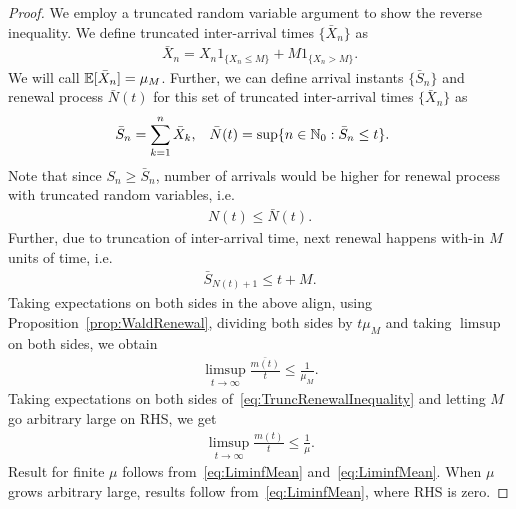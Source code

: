 \documentclass[a4paper,10pt, english]{article}
\begin{document}
\begin{proof}
	We employ a truncated random variable argument to show the reverse inequality. We define truncated inter-arrival times $\{\bar{X}_n\}$ as 
	\begin{align*}
	\bar{X}_n = X_n 1_{\{X_n \leq M\}} + M1_{\{X_n > M\}}.
	\end{align*}
	We will call $\mathbb{E}[\bar{X}_n] = \mu_M$. Further, we can define arrival instants $\{\bar{S}_n\}$ and renewal process $\bar{N}(t)$ for this set of truncated inter-arrival times $\{\bar{X}_n\}$ as 
	\begin{align*}
	\bar{S}_n &= \sum_{k=1}^n \bar{X}_k, & \bar{N}(t) &= \sup\{n \in \mathbb{N}_0: \bar{S}_n \leq t\}.
	\end{align*}
	Note that since $S_n \geq \bar{S}_n$, number of arrivals would be higher for renewal process with truncated random variables, i.e. 
	\begin{align}
	\label{eq:TruncRenewalInequality}
	N(t) \leq \bar{N}(t).
	\end{align}
	Further, due to truncation of inter-arrival time, next renewal happens with-in $M$ units of time, i.e.
	\begin{align*}
	\bar{S}_{N(t)+1} \leq t+M.
	\end{align*}
	Taking expectations on both sides in the above align, using Proposition~\ref{prop:WaldRenewal}, dividing both sides by $t \mu_M$ and taking $\limsup$ on both sides, we obtain
	\begin{align*}
	\limsup_{t \to \infty}\frac{\bar{m(t)}}{t} \leq \frac{1}{\mu_M}.
	\end{align*}
	Taking expectations on both sides of~\eqref{eq:TruncRenewalInequality} and letting $M$ go arbitrary large on RHS, we get
	\begin{align}
	\label{eq:LimsupMean}
	\limsup_{t \to \infty}\frac{m(t)}{t} \leq \frac{1}{\mu}.
	\end{align}
	Result for finite $\mu$ follows from~\eqref{eq:LiminfMean} and~\eqref{eq:LiminfMean}. When $\mu$ grows arbitrary large, results follow from~\eqref{eq:LiminfMean}, where RHS is zero. 
\end{proof}
\end{document}
